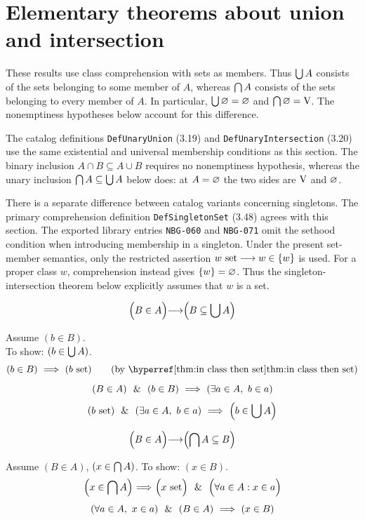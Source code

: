 \def\topic{}

\section{Elementary theorems about union and intersection}
These results use class comprehension with sets as members. Thus
$\bigcup A$ consists of the sets belonging to some member of $A$, whereas
$\bigcap A$ consists of the sets belonging to every member of $A$.
In particular, $\bigcup\varnothing=\varnothing$ and
$\bigcap\varnothing=\mathrm{V}$. The nonemptiness hypotheses below account
for this difference.
\begin{note}
The catalog definitions \texttt{DefUnaryUnion} (3.19) and
\texttt{DefUnaryIntersection} (3.20) use the same existential and
universal membership conditions as this section. The binary inclusion
$A\cap B\subseteq A\cup B$ requires no nonemptiness hypothesis, whereas the
unary inclusion $\bigcap A\subseteq\bigcup A$ below does: at
$A=\varnothing$ the two sides are $\mathrm{V}$ and $\varnothing$.

There is a separate difference between catalog variants concerning
singletons. The primary comprehension definition \texttt{DefSingletonSet}
(3.48) agrees with this section. The exported library entries
\texttt{NBG-060} and \texttt{NBG-071} omit the sethood condition when
introducing membership in a singleton. Under the present set-member
semantics, only the restricted assertion $w\mathrm{\ set}\longrightarrow w\in\{w\}$
is used. For a proper class $w$, comprehension instead gives
$\{w\}=\varnothing$. Thus the singleton-intersection theorem below
explicitly assumes that $w$ is a set.
\end{note}

\begin{theorem}
\[
\left(B\in A\middle)
\longrightarrow
\middle(B \subseteq \bigcup A\right)
\]
\end{theorem}
\Proof
Assume $(b\in B)$.\\
To show: $(b\in \bigcup A)$.
\[
(b\in B)
\IMPLIES
(b\set)
\tag{by \myref{thm:in class then set}}
\]
\[
(B\in A)
\ \ \&\ \ 
(b\in B)
\ \Longrightarrow\ 
(\exists a\in A,\ b\in a)
\]
\[
(b\mathrm{\ set})
\ \ \&\ \ 
(\exists a\in A,\ b\in a)
\ \Longrightarrow\ 
\left(b\in \bigcup A\right)
\]
\Done
\begin{theorem}
\[
\left(B\in A\middle)
\longrightarrow
\middle(\bigcap A\subseteq B\right)
\]
\end{theorem}
\Proof
Assume $(B\in A)$, $(x\in \bigcap A)$. To show: $(x\in B)$.
\[
\left(x\in \bigcap A\middle)
\ \Longrightarrow\ 
\middle(x\mathrm{\ set}\middle)
\ \ \&\ \ 
\middle(\forall a\in A : x\in a\right)
\]
\[
(\forall a\in A,\ x\in a)
\ \ \&\ \ 
(B\in A)
\ \Longrightarrow\ 
(x\in B)
\]
\Done

